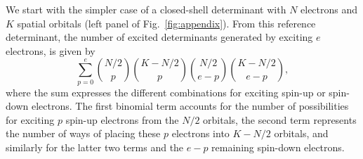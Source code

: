 \documentclass[aip,jcp,reprint,noshowkeys,superscriptaddress]{revtex4-1}
\begin{document}
We start with the simpler case of a closed-shell determinant with $N$ electrons and $K$ spatial orbitals (left panel of Fig.~\ref{fig:appendix}).
From this reference determinant, the number of excited determinants generated by exciting $e$ electrons, is given by \cite{SzaboBook}
\begin{equation}
	\sum_{p=0}^{e} \binom{N/2}{p} \binom{K-N/2}{p} \binom{N/2}{e-p} \binom{K-N/2}{e-p},
\label{eq:e_closed}
\end{equation}
where the sum expresses the different combinations for exciting spin-up or spin-down electrons.
The first binomial term accounts for the number of possibilities for exciting $p$ spin-up electrons from the $N/2$ orbitals,
the second term represents the number of ways of placing these $p$ electrons into $K-N/2$ orbitals,
and similarly for the latter two terms and the $e-p$ remaining spin-down electrons.
\end{document}
